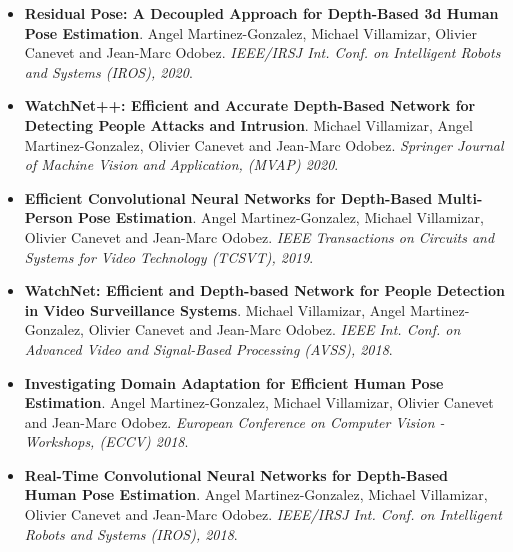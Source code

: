 \documentclass[10 pt]{article}
\begin{document}
\begin{itemize}[noitemsep]
\item \textbf{Residual Pose: A Decoupled Approach for Depth-Based 3d Human Pose Estimation}.
Angel Martinez-Gonzalez, Michael Villamizar, Olivier Canevet and Jean-Marc Odobez.
\textit{IEEE/IRSJ Int. Conf. on Intelligent Robots and Systems (IROS), 2020}.
\vspace{.05cm}
%

\item \textbf{WatchNet++: Efficient and Accurate Depth-Based Network for Detecting People Attacks and Intrusion}.
Michael Villamizar, Angel Martinez-Gonzalez, Olivier Canevet and Jean-Marc Odobez.
\textit{Springer Journal of Machine Vision and Application, (MVAP) 2020}.
\vspace{.05cm}
%

\item \textbf{Efficient Convolutional Neural Networks for Depth-Based Multi-Person Pose Estimation}. 
Angel Martinez-Gonzalez, Michael Villamizar, Olivier Canevet and Jean-Marc Odobez.
\textit{IEEE Transactions on Circuits and Systems for Video Technology (TCSVT), 2019}.
\vspace{.05cm}
%

\item \textbf{WatchNet: Efficient and Depth-based Network for People Detection in Video Surveillance Systems}.
Michael Villamizar, Angel Martinez-Gonzalez, Olivier Canevet and Jean-Marc Odobez.
\textit{IEEE Int. Conf. on Advanced Video and Signal-Based Processing (AVSS), 2018}.
\vspace{.05cm}
%

\item  \textbf{Investigating Domain Adaptation for Efficient Human Pose Estimation}.
Angel Martinez-Gonzalez, Michael Villamizar, Olivier Canevet and Jean-Marc Odobez.
\textit{European Conference on Computer Vision - Workshops, (ECCV) 2018}.
\vspace{.05cm}

\item \textbf{Real-Time Convolutional Neural Networks for Depth-Based Human Pose Estimation}.
Angel Martinez-Gonzalez, Michael Villamizar, Olivier Canevet and Jean-Marc Odobez.
\textit{IEEE/IRSJ Int. Conf. on Intelligent Robots and Systems (IROS), 2018}.
\vspace{.05cm}
%


\end{itemize}
\end{document}
